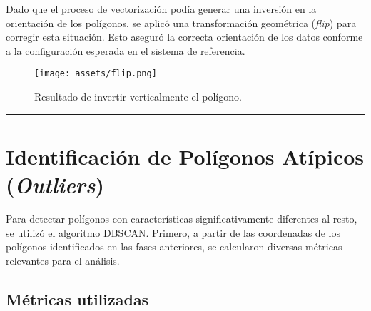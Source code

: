 \documentclass[twocolumn, fontsize=10pt]{article}
\begin{document}
Dado que el proceso de vectorización podía generar una inversión en la orientación de los polígonos, se aplicó una transformación geométrica (\textit{flip}) para corregir esta situación. Esto aseguró la correcta orientación de los datos conforme a la configuración esperada en el sistema de referencia.

\begin{figure}[H]
    \centering
    \texttt{[image: assets/flip.png]}
    \caption{Resultado de invertir verticalmente el polígono.}
    \label{fig:flipped}
\end{figure}

\rule{\linewidth}{0.5pt}
\section{Identificación de Polígonos Atípicos (\textit{Outliers})}

Para detectar polígonos con características significativamente diferentes al resto, se utilizó el algoritmo DBSCAN. Primero, a partir de las coordenadas de los polígonos identificados en las fases anteriores, se calcularon diversas métricas relevantes para el análisis.

\subsection{Métricas utilizadas}
\end{document}
